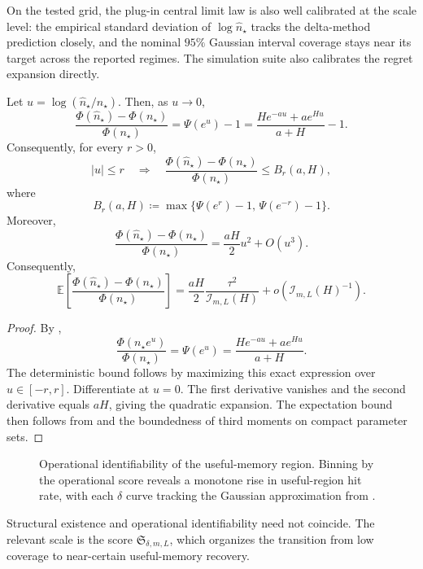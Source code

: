 

On the tested grid, the plug-in central limit law is also well calibrated at the
scale level: the empirical standard deviation of $\log \widehat n_\star$ tracks
the delta-method prediction closely, and the nominal $95\%$ Gaussian interval
coverage stays near its target across the reported regimes. The simulation suite
also calibrates the regret expansion directly.

\begin{proposition}
\label{prop:plugin_horizon_regret}
Let $u = \log(\widehat n_\star/n_\star)$. Then, as $u \to 0$,
\[
  \frac{\Phi(\widehat n_\star)-\Phi(n_\star)}{\Phi(n_\star)}
  = \Psi(e^u)-1
  = \frac{H e^{-au} + a e^{Hu}}{a+H} - 1.
\]
Consequently, for every $r>0$,
\[
  |u|\le r
  \quad\Longrightarrow\quad
  \frac{\Phi(\widehat n_\star)-\Phi(n_\star)}{\Phi(n_\star)}
  \le
  B_r(a,H),
\]
where
\[
  B_r(a,H)
  \coloneqq
  \max\bigl\{\Psi(e^r)-1,\,\Psi(e^{-r})-1\bigr\}.
\]
Moreover,
\[
  \frac{\Phi(\widehat n_\star)-\Phi(n_\star)}{\Phi(n_\star)}
  = \frac{aH}{2}u^2 + O(u^3).
\]
Consequently,
\[
  \mathbb E\!
  \left[
    \frac{\Phi(\widehat n_\star)-\Phi(n_\star)}{\Phi(n_\star)}
  \right]
  = \frac{aH}{2}\frac{\tau^2}{\mathcal I_{m,L}(H)} + o\!\left(\mathcal I_{m,L}(H)^{-1}\right).
\]
\end{proposition}

\begin{proof}
By ,
\[
  \frac{\Phi(n_\star e^u)}{\Phi(n_\star)} = \Psi(e^u)
  = \frac{H e^{-au} + a e^{Hu}}{a+H}.
\]
The deterministic bound follows by maximizing this exact expression over
$u\in[-r,r]$. Differentiate at $u=0$. The first derivative vanishes and the
second derivative equals $aH$, giving the quadratic expansion. The expectation
bound then follows from  and the boundedness of
third moments on compact parameter sets.
\end{proof}

\begin{figure}[!htbp]
\centering
{}
\caption{Operational identifiability of the useful-memory region. Binning by the operational score reveals a monotone rise in useful-region hit rate, with each $\delta$ curve tracking the Gaussian approximation from .}
\label{fig:inferable_horizon}
\end{figure}

Structural existence and operational identifiability need not coincide. The
relevant scale is the score $\mathfrak S_{\delta,m,L}$, which organizes the
transition from low coverage to near-certain useful-memory recovery.
